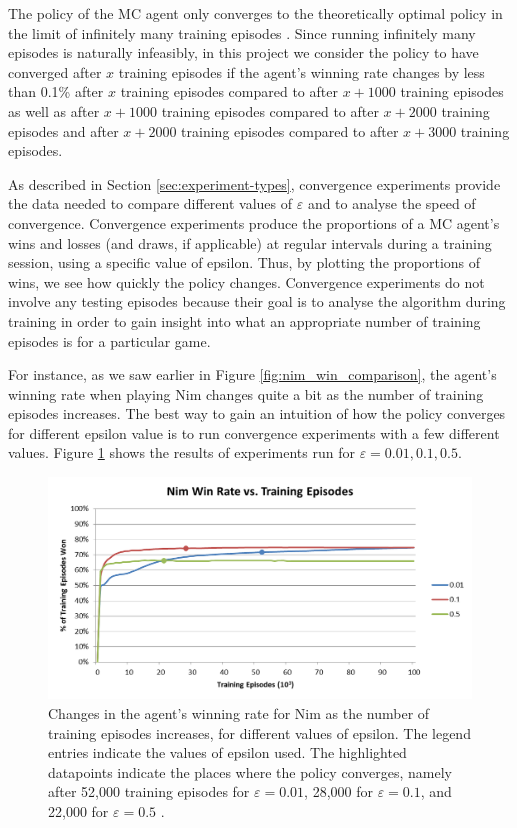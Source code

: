 \documentclass[11pt,a4paper]{report}
\begin{document}
The policy of the MC agent only converges to the theoretically optimal policy in the limit of infinitely many training episodes \cite{rl-book}. Since running infinitely many episodes is naturally infeasibly, in this project we consider the policy to have converged after $x$ training episodes if the agent's winning rate changes by less than 0.1\% after $x$ training episodes compared to after $x+1000$ training episodes as well as after $x+1000$ training episodes compared to after $x+2000$ training episodes and after $x+2000$ training episodes compared to after $x+3000$ training episodes.

As described in Section \ref{sec:experiment-types}, convergence experiments provide the data needed to compare different values of $\varepsilon$ and to analyse the speed of convergence. Convergence experiments produce the proportions of a MC agent's wins and losses (and draws, if applicable) at regular intervals during a training session, using a specific value of epsilon. Thus, by plotting the proportions of wins, we see how quickly the policy changes. Convergence experiments do not involve any testing episodes because their goal is to analyse the algorithm during training in order to gain insight into what an appropriate number of training episodes is for a particular game.

For instance, as we saw earlier in Figure \ref{fig:nim_win_comparison}, the agent's winning rate when playing Nim changes quite a bit as the number of training episodes increases. The best way to gain an intuition of how the policy converges for different epsilon value is to run convergence experiments with a few different values. Figure \ref{nim-convergence-comparison} shows the results of experiments run for $\varepsilon = 0.01, 0.1, 0.5$.

\begin{figure}[htbp]
	\begin{center}
		\includegraphics[width=\linewidth]{Nim_PerformanceResults_Comparison.png}
		\caption{Changes in the agent's winning rate for Nim as the number of training episodes increases, for different values of epsilon. The legend entries indicate the values of epsilon used. The highlighted datapoints indicate the places where the policy converges, namely after 52,000 training episodes for $\varepsilon = 0.01$, 28,000 for $\varepsilon = 0.1$, and 22,000 for $\varepsilon = 0.5$ .}
		\label{nim-convergence-comparison}
	\end{center}
\end{figure}
\end{document}
